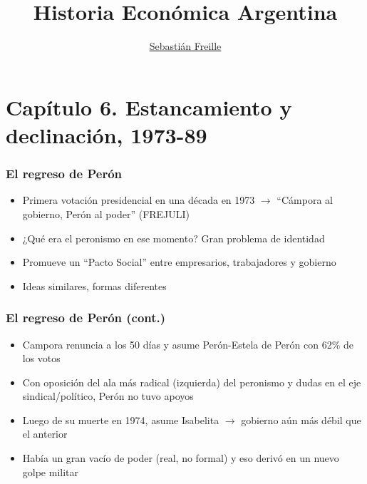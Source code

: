 \documentclass[14pt,aspectratio=169]{beamer}
\title{Historia Económica Argentina}
\author{\underline{Sebastián Freille} \inst{1}}
\institute[shortinst]{\inst{1} IEF-UNC \\ UCC}
\date{}
\begin{document}
{
  \begin{frame}
    \titlepage
  \end{frame}
}


\section{Capítulo 6. Estancamiento y declinación, 1973-89}

\begin{frame}\frametitle{El regreso de Perón}
                 \begin{itemize}\itemsep 5pt \medskip
                 \item Primera votación presidencial en una década en
                   1973 $\longrightarrow$ ``Cámpora al gobierno, Perón
                   al poder'' (FREJULI)
                   \item ¿Qué era el peronismo en ese momento? Gran
                     problema de identidad
                     \item Promueve un ``Pacto Social'' entre
                       empresarios, trabajadores y gobierno
                       \item Ideas similares, formas diferentes
                   \end{itemize}
               \end{frame}



\begin{frame}\frametitle{El regreso de Perón (cont.)}
                 \begin{itemize}\itemsep 5pt \medskip
                 \item Campora renuncia a los 50 días y
                   asume Perón-Estela de Perón con 62\% de los votos
                   \item Con oposición del ala más radical (izquierda)
                     del peronismo y dudas en el eje
                     sindical/político, Perón no tuvo apoyos
                     \item Luego de su muerte en 1974, asume Isabelita
                       $\longrightarrow$ gobierno aún más débil que el
                       anterior
                       \item Había un gran vacío de poder (real, no
                         formal) y eso derivó en un nuevo golpe militar
                   \end{itemize}
               \end{frame}
\end{document}
